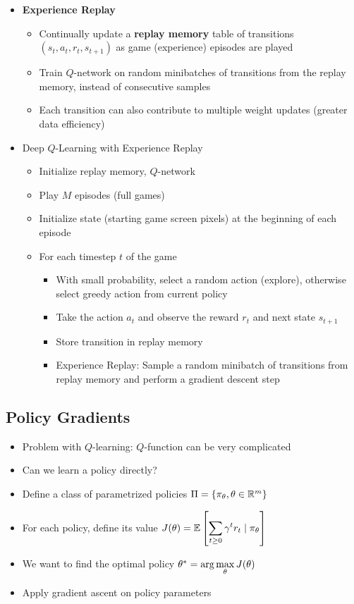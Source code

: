 \begin{itemize}
	\item \textbf{Experience Replay}
	\begin{itemize}
		\item Continually update a \textbf{replay memory} table of transitions $(s_t, a_t, r_t, s_{t+1})$ as game (experience) episodes are played
		\item Train $Q$-network on random minibatches of transitions from the replay memory, instead of consecutive samples
		\item Each transition can also contribute to multiple weight updates (greater data efficiency)
	\end{itemize}
	\item Deep $Q$-Learning with Experience Replay
	\begin{itemize}
		\item Initialize replay memory, $Q$-network
		\item Play $M$ episodes (full games)
		\item Initialize state (starting game screen pixels) at the beginning of each episode
		\item For each timestep $t$ of the game
		\begin{itemize}
			\item With small probability, select a random action (explore), otherwise select greedy action from current policy
			\item Take the action $a_t$ and observe the reward $r_t$ and next state $s_{t+1}$
			\item Store transition in replay memory
			\item Experience Replay: Sample a random minibatch of transitions from replay memory and perform a gradient descent step
		\end{itemize}
	\end{itemize}
\end{itemize}

\subsection{Policy Gradients}
\begin{itemize}
	\item Problem with $Q$-learning: $Q$-function can be very complicated
	\item Can we learn a policy directly?
	\item Define a class of parametrized policies $\Pi = \{\pi_\theta, \theta \in \mathbb{R}^m \}$
	\item For each policy, define its value $\displaystyle J(\theta) = \mathbb{E}\left[\sum_{t\geq 0} \gamma^tr_t\mid \pi_\theta\right]$
	\item We want to find the optimal policy $\theta^\ast = \displaystyle \arg\max_\theta J(\theta)$
	\item Apply gradient ascent on policy parameters
\end{itemize}

